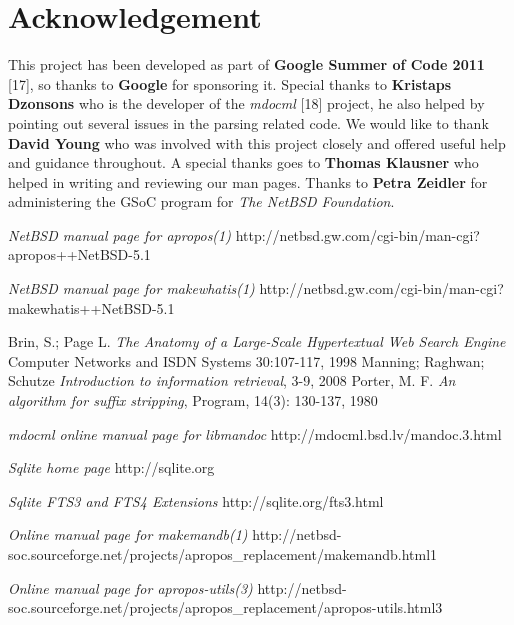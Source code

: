 \documentclass[titlepage, a4paper, 12pt]{article}
\begin{document}
\section{Acknowledgement}
This project has been developed as part of \textbf{Google Summer of Code 2011}
[17], so thanks to \textbf{Google} for sponsoring it. Special thanks to
\textbf{Kristaps Dzonsons} who is the developer of the \textit{mdocml} [18]
project, he also helped by pointing out several issues in the parsing related
code. We would like to thank \textbf{David Young} who was involved with
this project closely and offered useful help and guidance throughout. A special
thanks goes to \textbf{Thomas Klausner} who helped in writing and reviewing our
man pages. Thanks to \textbf{Petra Zeidler} for administering the GSoC program
for \textit{The NetBSD Foundation}.
\begin{thebibliography}{20}
\emph{NetBSD manual page for apropos(1)}
\newline http://netbsd.gw.com/cgi-bin/man-cgi?apropos++NetBSD-5.1

\emph{NetBSD manual page for makewhatis(1)}
\newline http://netbsd.gw.com/cgi-bin/man-cgi?makewhatis++NetBSD-5.1

Brin, S.; Page L.
\emph{The Anatomy of a Large-Scale Hypertextual Web Search Engine}
Computer Networks and ISDN Systems
30:107-117, 1998
Manning; Raghwan; Schutze
\emph{Introduction to information retrieval},
3-9,
2008
Porter, M. F.
\emph{An algorithm for suffix stripping},
Program,
14(3): 130-137,
1980

\emph{mdocml online manual page for
libmandoc}
\newline http://mdocml.bsd.lv/mandoc.3.html

\emph{Sqlite home page}
\newline http://sqlite.org

\emph{Sqlite FTS3 and FTS4 Extensions}
\newline  http://sqlite.org/fts3.html

\emph{Online manual page for makemandb(1)}
\newline http://netbsd-soc.sourceforge.net/projects/apropos\_replacement/makemandb.html1

\emph{Online manual page for apropos-utils(3)}
\newline http://netbsd-soc.sourceforge.net/projects/apropos\_replacement/apropos-utils.html3


\end{thebibliography}
\end{document}
